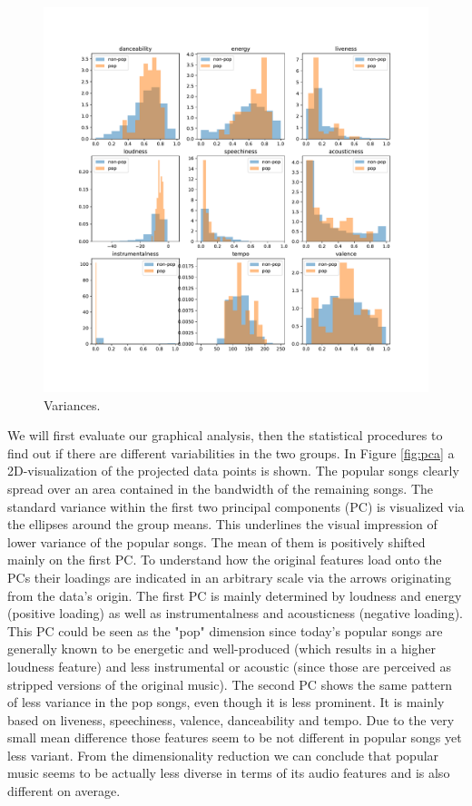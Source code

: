 \documentclass{article}
\begin{document}
\begin{figure}
  \centering
  \includegraphics[width=1\linewidth]{../fig/002_variances.pdf}
  \vspace*{-15mm}
  \caption{Variances.}
\end{figure}

We will first evaluate our graphical analysis, then the statistical procedures to find out if there are different variabilities in the two groups. In Figure \ref{fig:pca} a 2D-visualization of the projected data points is shown. The popular songs clearly spread over an area contained in the bandwidth of the remaining songs. The standard variance within the first two principal components (PC) is visualized via the ellipses around the group means. This underlines the visual impression of lower variance of the popular songs. The mean of them is positively shifted mainly on the first PC. To understand how the original features load onto the PCs their loadings are indicated in an arbitrary scale via the arrows originating from the data's origin. The first PC is mainly determined by loudness and energy (positive loading) as well as instrumentalness and acousticness (negative loading). This PC could be seen as the "pop" dimension since today's popular songs are generally known to be energetic and well-produced (which results in a higher loudness feature) and less instrumental or acoustic (since those are perceived as stripped versions of the original music). The second PC shows the same pattern of less variance in the pop songs, even though it is less prominent. It is mainly based on liveness, speechiness, valence, danceability and tempo. Due to the very small mean difference those features seem to be not different in popular songs yet less variant. From the dimensionality reduction we can conclude that popular music seems to be actually less diverse in terms of its audio features and is also different on average.
\end{document}
